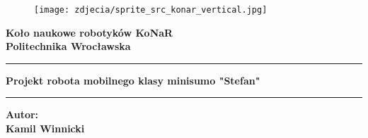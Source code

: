 \begin{titlepage} %
\begin{figure}[t] %
    \centering\texttt{[image: zdjecia/sprite\_src\_konar\_vertical.jpg]}
\end{figure}
\vspace{20mm}

\begin{Large}
 \begin{center}
	\textbf{Koło naukowe robotyków KoNaR\\ Politechnika Wrocławska\\}
	\vspace{30mm}
    

        
            \hrule
            \vspace{10mm}
	{\huge{\bf Projekt robota mobilnego klasy minisumo "Stefan"}}
            \vspace{10mm}
            \hrule
\end{center}
\end{Large}


\vspace{36mm}
\begin{minipage}[t]{0.47\textwidth}
	
\end{minipage}
\hfill
\begin{minipage}[t]{0.47\textwidth}\raggedleft
	{\large{\bf Autor:\\ Kamil Winnicki}}
\end{minipage}

\vspace{25mm}

\hrulefill

\vspace{5mm}


\end{titlepage}